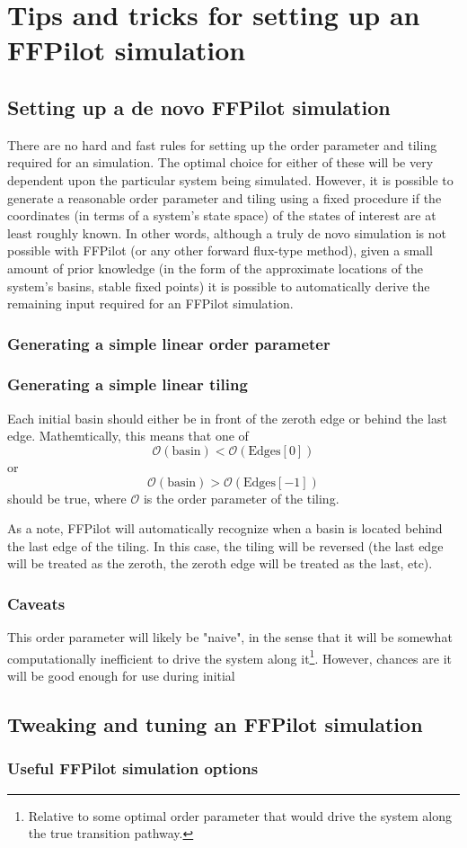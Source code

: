 \chapter{Tips and tricks for setting up an FFPilot simulation}

\section{Setting up a de novo FFPilot simulation}

There are no hard and fast rules for setting up the order parameter and tiling required for an  simulation. The optimal choice for either of these will be very dependent upon the particular system being simulated. However, it is possible to generate a reasonable order parameter and tiling using a fixed procedure if the coordinates (in terms of a system's state space) of the states of interest are at least roughly known. In other words, although a truly de novo simulation is not possible with FFPilot (or any other forward flux-type method), given a small amount of prior knowledge (in the form of the approximate locations of the system's basins, \ie stable fixed points) it is possible to automatically derive the remaining input required for an FFPilot simulation.

\subsection{Generating a simple linear order parameter}

\subsection{Generating a simple linear tiling}
Each initial basin should either be in front of the zeroth edge or behind the last edge. Mathemtically, this means that one of $$ \mathscr{O}(\text{basin}) < \mathscr{O}(\text{Edges}[0]) $$ or $$ \mathscr{O}(\text{basin}) > \mathscr{O}(\text{Edges}[-1]) $$ should be true, where $\mathscr{O}$ is the order parameter of the tiling.

As a note, FFPilot will automatically recognize when a basin is located behind the last edge of the tiling. In this case, the tiling will be reversed (the last edge will be treated as the zeroth, the zeroth edge will be treated as the last, etc).

\subsection{Caveats}
This order parameter will likely be "naive", in the sense that it will be somewhat computationally inefficient to drive the system along it\footnote{Relative to some optimal order parameter that would drive the system along the true transition pathway.}. However, chances are it will be good enough for use during initial 

\section{Tweaking and tuning an FFPilot simulation}
\subsection{Useful FFPilot simulation options}
